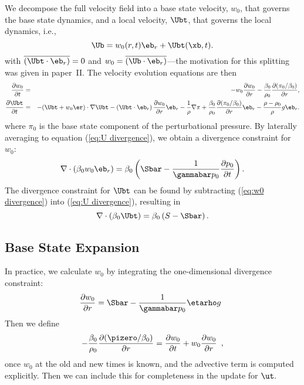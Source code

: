 We decompose the full velocity field into a base state velocity,
$w_0$, that governs the base state dynamics, and a local velocity,
$\Ubt$, that governs the local dynamics, i.e., 
\begin{equation}
\Ub = w_0(r,t)\eb_r + \Ubt(\xb,t).
\end{equation}
with
$\overline{(\Ubt\cdot\eb_r)} = 0$ and
$w_0 = \overline{(\Ub\cdot\eb_r)}$---the motivation for this splitting was given in paper~II.
The velocity evolution equations are then 
\begin{eqnarray}
\frac{\partial w_0}{\partial t} &=& -w_0\frac{\partial w_0}{\partial
  r} - \frac{\beta_0}{\rho_0}\frac{\partial(\pi_0/\beta_0)}{\partial r},\label{eq:w0
  evolution}\\ 
%
\frac{\partial\Ubt}{\partial t} &=& -(\Ubt + w_0\er)\cdot\nabla\Ubt
  - \left(\Ubt\cdot\eb_r\right)\frac{\partial w_0}{\partial r}\eb_r -
\frac{1}{\rho}\nabla\pi +
\frac{\beta_0}{\rho_0}\frac{\partial(\pi_0/\beta_0)}{\partial r}\eb_r -
\frac{\rho-\rho_0}{\rho}g\eb_r.\label{eq:utildeupd}
\end{eqnarray}
where $\pi_0$ is the base state component of the perturbational pressure.
By laterally averaging to equation (\ref{eq:U divergence}),
we obtain a divergence constraint for $w_0$:
\begin{equation}
\nabla\cdot(\beta_0 w_0 \eb_r) = 
    \beta_0\left(\Sbar - \frac{1}{\gammabar p_0}
           \frac{\partial p_0}{\partial t}\right).\label{eq:w0 divergence}
\end{equation}
The divergence constraint for $\Ubt$ can be found by subtracting
(\ref{eq:w0 divergence}) into (\ref{eq:U divergence}), resulting in
\begin{equation}
\nabla\cdot\left(\beta_0\Ubt\right) = \beta_0\left(S-\Sbar\right).\label{eq:utilde divergence}
\end{equation}



\subsection{Base State Expansion}


In practice, we calculate $w_0$ by integrating
the one-dimensional divergence constraint:
\begin{equation}
\frac{\partial w_0}{\partial r} = \Sbar - \frac{1}{\gammabar p_0} \etarho g \enskip 
\end{equation}
Then we define 
\begin{equation}
- \frac{\beta_0}{\rho_0} \frac{\partial (\pizero/\beta_0)}{\partial r} = \frac{\partial w_0}{\partial t} + 
   w_0 \frac{\partial w_0}{\partial r} \enskip, \label{eq:pizero}
\end{equation}
once $w_0$ at the old and new times is known, and the advective term is computed explicitly.
Then we can include this for completeness in the update for $\ut.$




